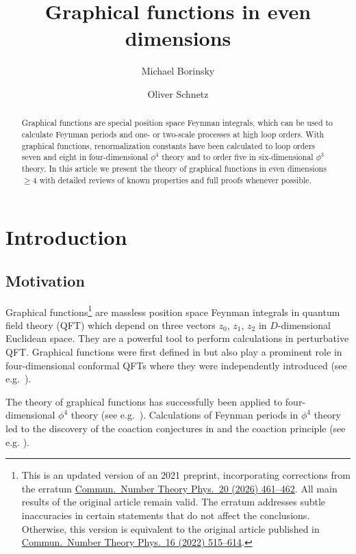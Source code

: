 \documentclass[oneside]{amsart}
\title{Graphical functions in even dimensions}
\date{}
\author{Michael Borinsky \and Oliver Schnetz}
\theoremstyle{plain}
\newcommand*{\doilink}[2]{\href{https://doi.org/\detokenize{#2}}{#1}}
\begin{document}

\maketitle
\begin{abstract}
Graphical functions are special position space Feynman integrals, which can be used to calculate Feynman periods and one- or two-scale processes at high loop orders.
With graphical functions, renormalization constants have been calculated to loop orders seven and eight in four-dimensional $\phi^4$ theory and to order five in six-dimensional $\phi^3$ theory.
In this article we present the theory of graphical functions in even dimensions $\geq4$ with detailed reviews of known properties and full proofs whenever possible.
\end{abstract}

\section{Introduction}
\subsection{Motivation}
Graphical functions\footnote{This is an updated version of an 2021 preprint, incorporating corrections from the erratum \doilink{Commun.\ Number Theory Phys.\ 20 (2026) 461--462}{10.4310/CNTP.260606021019}. 
All main results of the original article remain valid. The erratum addresses subtle inaccuracies in certain statements that do not affect the conclusions.
Otherwise, this version is equivalent to the original article published in \doilink{Commun.\ Number Theory Phys.\ 16 (2022) 515--614}{10.4310/CNTP.2022.v16.n3.a3}.}
 are massless position space Feynman integrals in quantum field theory (QFT) which depend on three vectors $z_0$, $z_1$, $z_2$ in $D$-dimensional Euclidean space.
They are a powerful tool to perform calculations in perturbative QFT. Graphical functions were first defined in \cite{gf} but also play a prominent role in four-dimensional conformal
QFTs where they were independently introduced (see e.g.\ \cite{SYM}).

The theory of graphical functions has successfully been applied to four-dimensional $\phi^4$ theory (see e.g.\ \cite{ZZ,gf,numfunct}). Calculations of Feynman periods
in $\phi^4$ theory led to the discovery of the coaction conjectures in \cite{coaction} and the coaction principle (see e.g. \cite{Bcoact1,Bcoact2,motg2}). 
\end{document}
